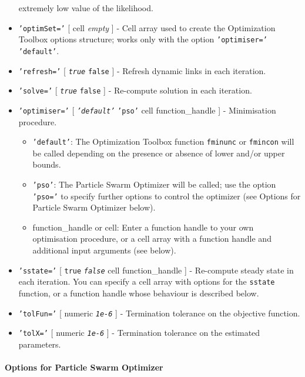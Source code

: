 \begin{itemize}
  extremely low value of the likelihood.
\item
  \texttt{'optimSet='} {[} cell \textbar{} \emph{empty} {]} - Cell array
  used to create the Optimization Toolbox options structure; works only
  with the option \texttt{'optimiser='} \texttt{'default'}.
\item
  \texttt{'refresh='} {[} \emph{\texttt{true}} \textbar{} \texttt{false}
  {]} - Refresh dynamic links in each iteration.
\item
  \texttt{'solve='} {[} \emph{\texttt{true}} \textbar{} \texttt{false}
  {]} - Re-compute solution in each iteration.
\item
  \texttt{'optimiser='} {[} \emph{\texttt{'default'}} \textbar{}
  \texttt{'pso'} \textbar{} cell \textbar{} function\_handle {]} -
  Minimisation procedure.

  \begin{itemize}
  \item
    \texttt{'default'}: The Optimization Toolbox function
    \texttt{fminunc} or \texttt{fmincon} will be called depending on the
    presence or absence of lower and/or upper bounds.
  \item
    \texttt{'pso'}: The Particle Swarm Optimizer will be called; use the
    option \texttt{'pso='} to specify further options to control the
    optimizer (see Options for Particle Swarm Optimizer below).
  \item
    function\_handle or cell: Enter a function handle to your own
    optimisation procedure, or a cell array with a function handle and
    additional input arguments (see below).
  \end{itemize}
\item
  \texttt{'sstate='} {[} \texttt{true} \textbar{} \emph{\texttt{false}}
  \textbar{} cell \textbar{} function\_handle {]} - Re-compute steady
  state in each iteration. You can specify a cell array with options for
  the \texttt{sstate} function, or a function handle whose behaviour is
  described below.
\item
  \texttt{'tolFun='} {[} numeric \textbar{} \emph{\texttt{1e-6}} {]} -
  Termination tolerance on the objective function.
\item
  \texttt{'tolX='} {[} numeric \textbar{} \emph{\texttt{1e-6}} {]} -
  Termination tolerance on the estimated parameters.
\end{itemize}

\paragraph{Options for Particle Swarm
Optimizer}\label{options-for-particle-swarm-optimizer}

